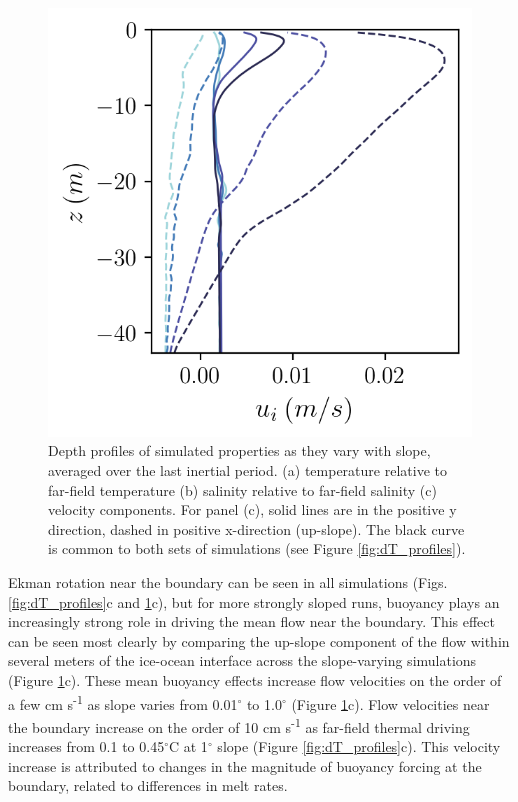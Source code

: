 \documentclass[draft]{agujournal2019}
\begin{document}
\begin{figure}[h!]
\begin{minipage}{0.33\textwidth}
    \end{minipage}%
    \begin{minipage}{0.33\textwidth}
        \includegraphics[trim={0 0cm 0 0},clip, width=\textwidth]{Figures/velocity_cmp_dslope_43h_tav13h_z_profile.png}
    \end{minipage}
    \caption{Depth profiles of simulated properties as they vary with slope, averaged over the last inertial period. (a) temperature relative to far-field temperature (b) salinity relative to far-field salinity (c) velocity components. For panel (c), solid lines are in the positive y direction, dashed in positive x-direction (up-slope). The black curve is common to both sets of simulations (see Figure \ref{fig:dT_profiles}).}
    \label{fig:dslope_profiles}
\end{figure}


Ekman rotation near the boundary can be seen in all simulations (Figs. \ref{fig:dT_profiles}c and \ref{fig:dslope_profiles}c), but for more strongly sloped runs, buoyancy plays an increasingly strong role in driving the mean flow near the boundary. This effect can be seen most clearly by comparing the up-slope component of the flow within several meters of the ice-ocean interface across the slope-varying simulations (Figure \ref{fig:dslope_profiles}c). These mean buoyancy effects increase flow velocities on the order of a few cm s\textsuperscript{-1} as slope varies from 0.01$^{\circ}$ to 1.0$^{\circ}$ (Figure \ref{fig:dslope_profiles}c). Flow velocities near the boundary increase on the order of 10 cm s\textsuperscript{-1} as far-field thermal driving increases from 0.1 to 0.45$^{\circ}$C at 1$^{\circ}$ slope (Figure \ref{fig:dT_profiles}c). This velocity increase is attributed to changes in the magnitude of buoyancy forcing at the boundary, related to differences in melt rates. 
\end{document}
